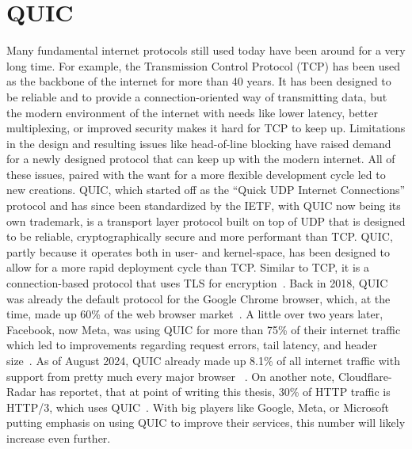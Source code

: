\section{QUIC}\label{sec:quic_bg}
Many fundamental internet protocols still used today have been around for 
a very long time.
For example, the Transmission Control Protocol (TCP) has been used as the backbone
of the internet for more than 40 years.
It has been designed to be reliable and to provide a connection-oriented
way of transmitting data, but the modern environment of the internet with
needs like lower latency, better multiplexing, or improved security makes it 
hard for TCP to keep up.
Limitations in the design and resulting issues like head-of-line blocking
have raised demand for a newly designed protocol that can keep up with the
modern internet. %
All of these issues, paired with the want for a more flexible development cycle
led to new creations.
QUIC, which started off as the ``Quick UDP Internet Connections'' protocol and has 
since been standardized by the IETF, with QUIC now being its own trademark, is a 
transport layer protocol built on top of UDP that is designed to be reliable, 
cryptographically secure and more performant than TCP\@.
QUIC, partly because it operates both in user- and kernel-space, has been designed to allow for a 
more rapid deployment cycle than TCP\@.
Similar to TCP, it is a connection-based protocol that uses TLS for encryption~\parencite{quic-explained}.
Back in 2018, QUIC was already the default protocol for the Google Chrome browser, which,
at the time, made up 60\% of the web browser market~\parencite{google-quic-usage}.
A little over two years later, Facebook, now Meta, was using QUIC for more than 75\% of 
their internet traffic which led to improvements regarding
request errors, tail latency, and header size~\parencite{facebook-quic-usage}.
As of August 2024, QUIC already made up 8.1\% of all internet traffic %
with support from pretty much every major browser
~\parencite{internet-quic-usage, article-quic-usage}.
On another note, Cloudflare-Radar has reportet, that at point of writing this thesis, 
30\% of HTTP traffic is HTTP/3, which uses QUIC~\parencite{cloudflare-radar}.
With big players like Google, Meta, or Microsoft putting emphasis on
using QUIC to improve their services, this number will likely increase even further.

